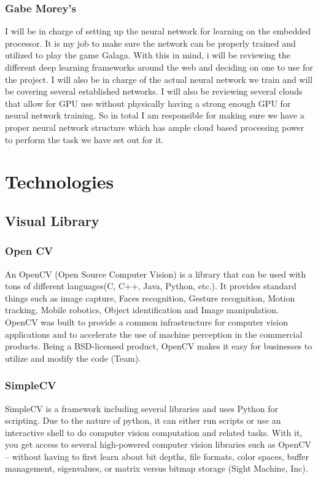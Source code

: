 \documentclass{scrreprt}
\begin{document}
\subsection{Gabe Morey’s}
I will be in charge of setting up the neural network for learning on the embedded processor. It is
my job to make sure the network can be properly trained and utilized to play the game Galaga.
With this in mind, i will be reviewing the different deep learning frameworks around the web
and deciding on one to use for the project. I will also be in charge of the actual neural network
we train and will be covering several established networks. I will also be reviewing several
clouds that allow for GPU use without physically having a strong enough GPU for neural
network training. So in total I am responsible for making sure we have a proper neural network
structure which has ample cloud based processing power to perform the task we have set out for
it.

\chapter{Technologies}
\section{Visual Library}
\subsection{Open CV}
An OpenCV (Open Source Computer Vision) is a library that can be used with tons of different languages(C, C++, Java, Python, etc.).
 It provides standard things such as image capture, Faces recognition, Gesture recognition, Motion tracking, Mobile robotics, Object identification and Image manipulation.
 OpenCV was built to provide a common infrastructure for computer vision applications and to accelerate the use of machine perception in the commercial products.
 Being a BSD-licensed product, OpenCV makes it easy for businesses to utilize and modify the code (Team).
\subsection{SimpleCV}
SimpleCV is a framework including several libraries and uses Python for scripting.
Due to the nature of python, it can either run scripts or use an interactive shell to do computer vision computation and related tasks.
With it, you get access to several high-powered computer vision libraries such as OpenCV – without having to first learn about bit depths,
file formats, color spaces, buffer management, eigenvalues, or matrix versus bitmap storage (Sight Machine, Inc).
\end{document}
